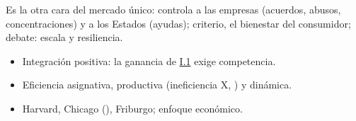 \documentclass{article}
\begin{document}
\begin{columnas}
\begin{ideaclave}
Es la otra cara del mercado único: controla a las empresas (acuerdos, abusos, concentraciones) y a los Estados (ayudas); criterio, el bienestar del consumidor; debate: escala y resiliencia.
\end{ideaclave}

\begin{itemize}
\item Integración positiva: la ganancia de \hyperref[rep:I.1]{I.1} exige competencia.
\item Eficiencia asignativa, productiva (ineficiencia X, ) y dinámica.
\item Harvard, Chicago (), Friburgo; enfoque económico.
\end{itemize}


\end{columnas}
\end{document}
